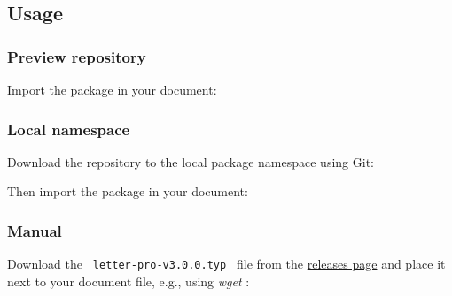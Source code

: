 \subsection{Usage}\label{usage}

\subsubsection{Preview repository}\label{preview-repository}

Import the package in your document:

\begin{Shaded}
\begin{Highlighting}[]
\end{Highlighting}
\end{Shaded}

\subsubsection{Local namespace}\label{local-namespace}

Download the repository to the local package namespace using Git:

\begin{Shaded}
\begin{Highlighting}[]
\ExtensionTok{$}
\end{Highlighting}
\end{Shaded}

Then import the package in your document:

\begin{Shaded}
\begin{Highlighting}[]
\end{Highlighting}
\end{Shaded}

\subsubsection{Manual}\label{manual}

Download the \texttt{\ letter-pro-v3.0.0.typ\ } file from the
\href{https://github.com/Sematre/typst-letter-pro/releases}{releases
page} and place it next to your document file, e.g., using \emph{wget} :

